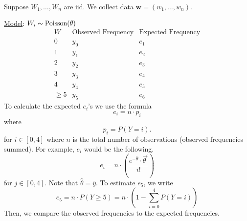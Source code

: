 \begin{exbox}
    \begin{example}
        Suppose $ W_1,\ldots ,W_n $ are iid. We collect data $ \bm{w}=(w_1,\ldots ,w_n) $.

        \underline{Model}: $ W_i \thicksim \operatorname{Poisson}(\theta) $
        \[
            \begin{array}{c|c|c|}
                W           & \text{Observed Frequency} & \text{Expected Frequency} \\
                \hline
                0           & y_0                       & e_1                       \\
                1           & y_1                       & e_2                       \\
                2           & y_2                       & e_3                       \\
                3           & y_3                       & e_4                       \\
                4           & y_4                       & e_5                       \\
                \geqslant 5 & y_5                       & e_6
            \end{array}
        \]
        To calculate the expected $ e_i $'s we use the formula
        \[ e_i=n\cdot p_i \]
        where
        \[ p_i=P(Y=i). \]
        for $ i\in[0,4] $ where $ n $ is the total number of observations (observed frequencies summed).
        For example, $ e_i $ would be the following.
        \[ e_i=n\cdot \left( \frac{e^{-\hat{\theta}}\cdot\hat{\theta}^{i}}{i!} \right) \]
        for $ j\in[0,4] $. Note that $ \hat{\theta}=\overline{y} $.
        To estimate $ e_5 $, we write
        \[ e_5=n\cdot P(Y\geqslant 5)=n\cdot \left( 1-\sum\limits_{i=0}^{4}P(Y=i) \right) \]
        Then, we compare the observed frequencies to the expected frequencies.
    \end{example}
\end{exbox}

